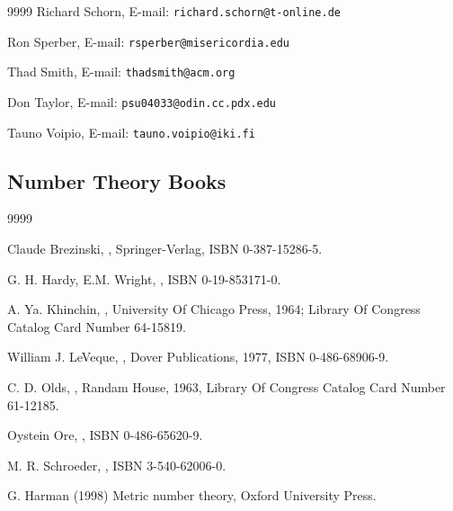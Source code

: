 \begin{thecustombibliography}{9999}
Richard Schorn,
E-mail: \texttt{richard.schorn@t-online.de}

Ron Sperber,
E-mail: \texttt{rsperber@misericordia.edu}

Thad Smith,
E-mail: \texttt{thadsmith@acm.org}

Don Taylor,
E-mail: \texttt{psu04033@odin.cc.pdx.edu}

Tauno Voipio,
E-mail: \texttt{tauno.voipio@iki.fi}

\end{thecustombibliography}


\subsection*{Number Theory Books}


\begin{thecustombibliography}{9999}

Claude Brezinski,
, 
Springer-Verlag,
ISBN 0-387-15286-5.

G. H. Hardy, E.M. Wright,
, ISBN 0-19-853171-0.

A. Ya. Khinchin, 
, University Of
Chicago Press, 1964; Library Of Congress Catalog Card
Number 64-15819.

William J. LeVeque,
,
Dover Publications, 1977,
ISBN 0-486-68906-9.

C. D. Olds,
,
Randam House, 1963,
Library Of Congress Catalog Card Number 61-12185.

Oystein Ore,
,
ISBN 0-486-65620-9.

M. R. Schroeder,
,
ISBN 3-540-62006-0.

G. Harman (1998) Metric number theory, Oxford University Press.
\end{thecustombibliography}


